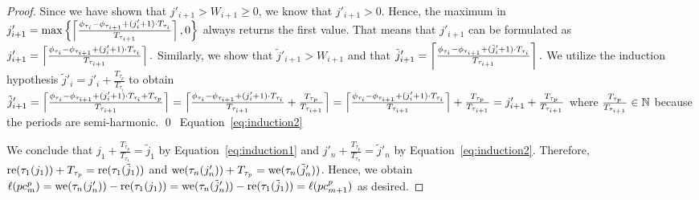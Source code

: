 \documentclass[10pt,conference]{resources/IEEEtran}
\theoremstyle{definition}
\theoremstyle{remark}
\newcommand{\pc}{{pc}}
\theoremstyle{definition}
\begin{document}
\begin{proof}
		Since we have shown that $j'_{i+1} > W_{i+1} \geq 0$, we know that $j'_{i+1}>0$.
		Hence, the maximum in $j'_{i+1} = \max\left\{{\left\lceil{\frac{\phi_{\tau_i} - \phi_{\tau_{i+1}} + (j'_i+1) \cdot T_{\tau_i}}{T_{\tau_{i+1}}}}\right\rceil , 0}\right\}$ always returns the first value. 
		That means that $j'_{i+1}$ can be formulated as
		\begin{math}
			j'_{i+1} = \left\lceil{\frac{\phi_{\tau_i} - \phi_{\tau_{i+1}} + (j'_i+1) \cdot T_{\tau_i}}{T_{\tau_{i+1}}}}\right\rceil.
		\end{math}
		Similarly, we show that $\tilde{j}'_{i+1} > W_{i+1}$ and that 
		\begin{math}
			\tilde{j}'_{i+1} = \left\lceil{\frac{\phi_{\tau_i} - \phi_{\tau_{i+1}} + (\tilde{j}'_i+1) \cdot T_{\tau_i}}{T_{\tau_{i+1}}}}\right\rceil.
		\end{math}
		We utilize the induction hypothesis $\tilde{j}'_i = j'_i + \frac{T_{\tau_p}}{T_{\tau_i}}$ to obtain
		\begin{math}
			\tilde{j}'_{i+1} 
			= \left\lceil{\frac{\phi_{\tau_i} - \phi_{\tau_{i+1}} + (j'_i +1) \cdot T_{\tau_i} + T_{\tau_p}}{T_{\tau_{i+1}}}}\right\rceil
			= \left\lceil{\frac{\phi_{\tau_i} - \phi_{\tau_{i+1}} + (j'_i +1) \cdot T_{\tau_i}}{T_{\tau_{i+1}}} + \frac{T_{\tau_p}}{T_{\tau_{i+1}}}}\right\rceil
			= \left\lceil{\frac{\phi_{\tau_i} - \phi_{\tau_{i+1}} + (j'_i +1) \cdot T_{\tau_i}}{T_{\tau_{i+1}}}}\right\rceil + \frac{T_{\tau_p}}{T_{\tau_{i+1}}}
			= j'_{i+1} + \frac{T_{\tau_p}}{T_{\tau_{i+1}}}
		\end{math}
		where $\frac{T_{\tau_p}}{T_{\tau_{i+1}}} \in \mathbb{N}$ because the periods are semi-harmonic.
		\qed~Equation~\eqref{eq:induction2}

		We conclude that $j_1 + \frac{T_{\tau_p}}{T_{\tau_1}} = \tilde{j}_1$ by Equation~\eqref{eq:induction1} and $j'_n + \frac{T_{\tau_p}}{T_{\tau_n}} = \tilde{j}'_n$ by Equation~\eqref{eq:induction2}.
		Therefore, $\operatorname{re}(\tau_1(j_1)) + T_{\tau_p} = \operatorname{re}(\tau_1(\tilde{j}_1))$ and $\operatorname{we}(\tau_n(j'_n)) + T_{\tau_p} = \operatorname{we}(\tau_n(\tilde{j}'_n))$.
		Hence, we obtain%
		\begin{math}
			\ell(\pc^p_m) = \we(\tau_n(j'_n)) - \re(\tau_1(j_1)) 
			= \we(\tau_n(\tilde{j}'_n)) - \re(\tau_1(\tilde{j}_1)) 
			= \ell(\pc^p_{m+1})
		\end{math}
		as desired.
	\end{proof}
\end{document}
